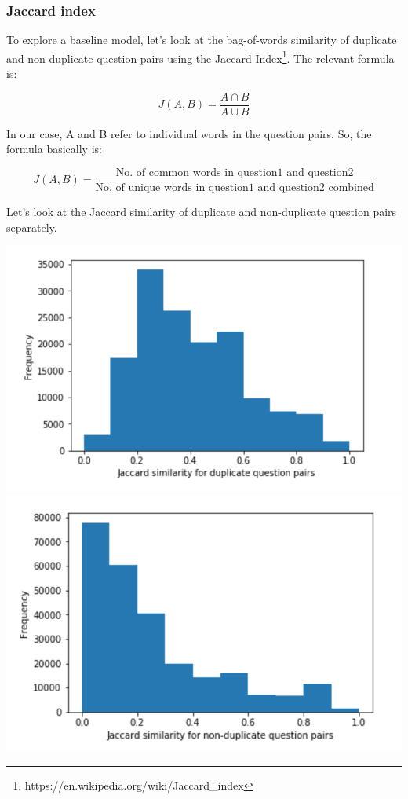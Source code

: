 \documentclass{article}
\begin{document}
\subsubsection{Jaccard index}

To explore a baseline model, let's look at the bag-of-words similarity of duplicate and non-duplicate question pairs using the Jaccard Index\footnote{https://en.wikipedia.org/wiki/Jaccard\_index}. The relevant formula is:

$$
J(A,B) = \frac{A \cap B}{A \cup B}
$$

In our case, A and B refer to individual words in the question pairs. So, the formula basically is:

$$
J(A,B) = \frac{\text{No. of common words in question1 and question2}}{\text{No. of unique words in question1 and question2 combined}}
$$

Let's look at the Jaccard similarity of duplicate and non-duplicate question pairs separately.

\noindent\includegraphics[width=\textwidth]{jaccard_duplicate}
\noindent\includegraphics[width=\textwidth]{jaccard_non_duplicate}
\end{document}
